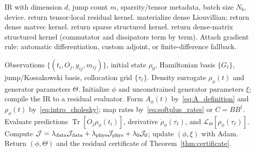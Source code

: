 \documentclass[11pt]{article}
\DeclareMathOperator{\Tr}{Tr}
\newcommand{\calJ}{\mathcal{J}}
\newcommand{\calL}{\mathcal{L}}
\newcommand{\rhophi}{\rho_{\phi}}
\begin{document}
\begin{algorithm}[h]
\caption{Residual-kernel dispatch from an open-system IR}
\label{alg:dispatch}
\begin{algorithmic}[1]
\REQUIRE IR with dimension $d$, jump count $m$, sparsity/tensor metadata, batch size $N_b$, device.
    \STATE return tensor-local residual kernel.
    \STATE materialize dense Liouvillian; return dense matvec kernel.
    \STATE return sparse structured kernel.
\ELSE
    \STATE return dense-matrix structured kernel (commutator and dissipators term by term).
\ENDIF
\STATE Attach gradient rule: automatic differentiation, custom adjoint, or finite-difference fallback.
\end{algorithmic}
\end{algorithm}

\begin{algorithm}[h]
\caption{CPTP-Compiler-PINN training}
\label{alg:cptp_compiler_pinn}
\begin{algorithmic}[1]
\REQUIRE Observations $\{(t_i,O_j,y_{ij},m_{ij})\}$, initial state $\rho_0$, Hamiltonian basis $\{G_\ell\}$, jump/Kossakowski basis, collocation grid $\{\tau_\ell\}$.
\ENSURE Density surrogate $\rhophi(t)$ and generator parameters $\Theta$.
\STATE Initialize $\phi$ and unconstrained generator parameters $\xi$; compile the IR to a residual evaluator.
    \STATE Form $A_\phi(t)$ by~\eqref{eq:A_definition} and $\rhophi(t)$ by~\eqref{eq:intro_cholesky}; map rates by~\eqref{eq:softplus_rates} or $C=BB^\dagger$.
    \STATE Evaluate predictions $\Tr[O_j\rhophi(t_i)]$, derivative $\dot\rhophi(\tau_\ell)$, and $\calL_\Theta[\rhophi(\tau_\ell)]$.
    \STATE Compute $\calJ=\lambda_{\rm data}\calJ_{\rm data}+\lambda_{\rm phys}\calJ_{\rm phys}+\lambda_0\calJ_0$; update $(\phi,\xi)$ with Adam.
\ENDFOR
\STATE Return $(\phi,\Theta)$ and the residual certificate of Theorem~\ref{thm:certificate}.
\end{algorithmic}
\end{algorithm}
\end{document}
